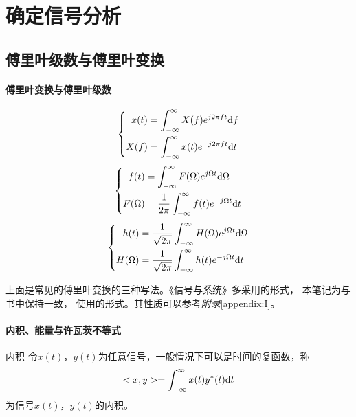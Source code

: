 \section{确定信号分析}
\subsection{傅里叶级数与傅里叶变换}
        \paragraph{傅里叶变换与傅里叶级数}\mbox{}

    \begin{equation}\label{eq:ft_f}
        \left\{ \begin{aligned}
            x(t) &=\int_{-\infty}^{\infty}X(f)e^{j2\pi ft}\text{\upshape d} f\\
            X(f) &=\int_{-\infty}^{\infty}x(t)e^{-j2\pi ft}\text{\upshape d} t
        \end{aligned} \right.
    \end{equation}
    \begin{equation}\label{eq:ft_omega}
        \left\{ \begin{aligned}
            f(t) &=\int_{-\infty}^{\infty}F(\Omega)e^{j\Omega t}\text{\upshape d} \Omega\\
            F(\Omega) &=\frac{1}{2\pi}\int_{-\infty}^{\infty}f(t)e^{-j\Omega t}\text{\upshape d} t
        \end{aligned} \right.
    \end{equation} 
    \begin{equation}
        \left\{ \begin{aligned}
            h(t) &=\frac{1}{\sqrt{2\pi}}\int_{-\infty}^{\infty}H(\Omega)e^{j\Omega t}\text{\upshape d} \Omega\\
            H(\Omega) &=\frac{1}{\sqrt{2\pi}}\int_{-\infty}^{\infty}h(t)e^{-j\Omega t}\text{\upshape d} t
        \end{aligned} \right.
    \end{equation}

    上面是常见的傅里叶变换的三种写法。《信号与系统》多采用的形式，
    本笔记为与书中保持一致，
    使用的形式。其性质可以参考\emph{附录}\ref{appendix:I}。

    \paragraph{内积、能量与许瓦茨不等式}\mbox{}

    \begin{mydef}{内积}\label{def:inner}
        令$x(t)$，$y(t)$为任意信号，一般情况下可以是时间的复函数，称
        \begin{equation}
            <x,y>=\int_{-\infty}^{\infty}x(t)y^*(t)\text{\upshape d} t
        \end{equation}
        为信号$x(t)$，$y(t)$的内积。
    \end{mydef}
    
